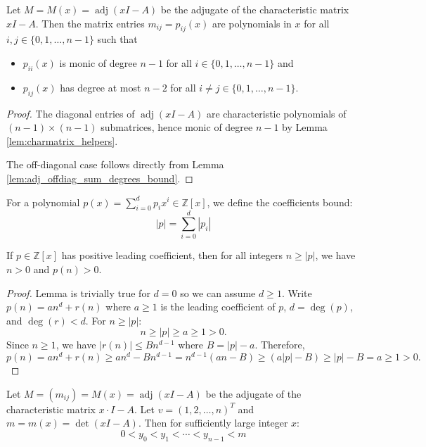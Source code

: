 \begin{lemma}
\label{lem:adj_poly}
\leanok
{}
Let $M = M(x) = \operatorname{adj}(x I - A)$ be the adjugate of the characteristic matrix $x I - A$.
Then the matrix entries $m_{ij} = p_{ij}(x)$ are polynomials in $x$ for all $i,j\in \{0,1,\ldots,n-1\}$ such that
\begin{itemize}
\item $p_{ii}(x)$ is monic of degree $n-1$ for all $i\in \{0,1,\ldots,n-1\}$ and
\item $p_{ij}(x)$ has degree at most $n-2$ for all $i\neq j\in \{0,1,\ldots,n-1\}$.
\end{itemize}
\end{lemma}

\begin{proof}
\leanok
The diagonal entries of $\operatorname{adj}(x I - A)$ are characteristic polynomials of $(n-1) \times (n-1)$ submatrices, hence monic of degree $n-1$ by Lemma \ref{lem:charmatrix_helpers}. 

The off-diagonal case follows directly from Lemma \ref{lem:adj_offdiag_sum_degrees_bound}.
\end{proof}

\begin{definition}
\label{def:coeff_bound}
\leanok
For a polynomial $p(x) = \sum_{i=0}^{d} p_i x^i \in \mathbb{Z}[x]$, we define the coefficients bound:
$$|p| = \sum_{i=0}^{d} |p_i|$$
\end{definition}

\begin{lemma}
\label{lem:polynomial_positive}
\leanok
If $p \in \mathbb{Z}[x]$ has positive leading coefficient, then for all integers $n \ge |p|$, we have $n > 0$ and $p(n) > 0$.
\end{lemma}

\begin{proof}
\leanok
Lemma is trivially true for $d=0$ so we can assume $d \geq 1$. Write $p(n) = an^d + r(n)$ where $a \ge 1$ is the leading coefficient of $p$, 
$d = \deg(p)$, and $\deg(r) < d$. 
For $n \ge |p|$:
$$n \ge |p| \ge a \ge 1 > 0.$$
Since $n \geq 1$, we have $|r(n)| \leq B n^{d-1}$ where $B = |p| - a$. Therefore,
$$p(n) = an^d + r(n) \geq an^d - Bn^{d-1} = n^{d-1}(an - B) \ge (a|p| - B) \ge |p| - B = a \ge 1 > 0.$$
\end{proof}

\begin{lemma}
\label{lem:adj_poly_strict_increasing}
\leanok
{}
Let $M = (m_{ij}) = M(x) = \operatorname{adj}(x I - A)$ be the adjugate of the characteristic matrix $x\cdot I - A$.
Let $v = (1,2,\ldots,n)^T$ and $m = m(x) = \det(x I - A)$. Then for sufficiently large integer $x$:
$$0 < y_0 < y_1 < \cdots < y_{n-1} < m$$
\end{lemma}

